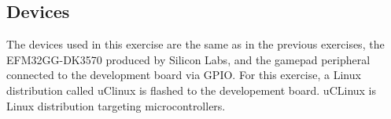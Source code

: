 \subsection{Devices}
The devices used in this exercise are the same as in the previous exercises, the EFM32GG-DK3570 produced by Silicon Labs, and the gamepad peripheral connected to the development board via GPIO.
For this exercise, a Linux distribution called uClinux is flashed to the developement board. uCLinux is Linux distribution targeting microcontrollers.
